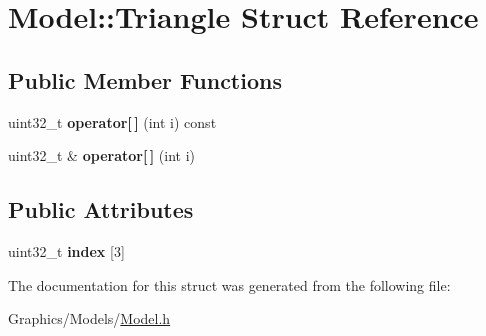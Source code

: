 \hypertarget{structModel_1_1Triangle}{}\section{Model\+:\+:Triangle Struct Reference}
\label{structModel_1_1Triangle}
\subsection*{Public Member Functions}
\begin{DoxyCompactItemize}
\item 
\mbox{\label{structModel_1_1Triangle_a7abcb6e12344405e6a41b180d9165dc7}} 
uint32\+\_\+t {\bfseries operator\mbox{[}$\,$\mbox{]}} (int i) const
\item 
\mbox{\label{structModel_1_1Triangle_a3a80af3a78260793fa9baba4eee077a8}} 
uint32\+\_\+t \& {\bfseries operator\mbox{[}$\,$\mbox{]}} (int i)
\end{DoxyCompactItemize}
\subsection*{Public Attributes}
\begin{DoxyCompactItemize}
\item 
\mbox{\label{structModel_1_1Triangle_ab40a9748b63a70d5ade5a4c34ecd4851}} 
uint32\+\_\+t {\bfseries index} \mbox{[}3\mbox{]}
\end{DoxyCompactItemize}


The documentation for this struct was generated from the following file\+:\begin{DoxyCompactItemize}
\item 
Graphics/\+Models/\hyperlink{Model_8h}{Model.\+h}\end{DoxyCompactItemize}
